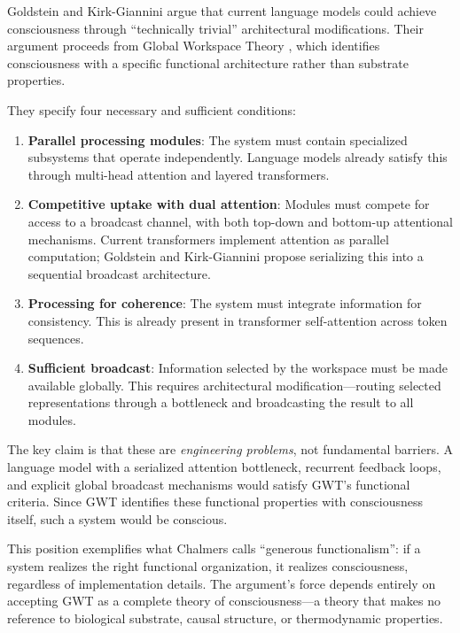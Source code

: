 Goldstein and Kirk-Giannini \cite{goldstein2024case} argue that current language models
could achieve consciousness through ``technically trivial'' architectural modifications.
Their argument proceeds from Global Workspace Theory \cite{baars1988cognitive,
dehaene2014toward}, which identifies consciousness with a specific functional architecture
rather than substrate properties.

They specify four necessary and sufficient conditions:

\begin{enumerate}[leftmargin=2em]
\item \textbf{Parallel processing modules}: The system must contain specialized subsystems
      that operate independently. Language models already satisfy this through multi-head
      attention and layered transformers.
\item \textbf{Competitive uptake with dual attention}: Modules must compete for access to
      a broadcast channel, with both top-down and bottom-up attentional mechanisms. Current
      transformers implement attention as parallel computation; Goldstein and Kirk-Giannini
      propose serializing this into a sequential broadcast architecture.
\item \textbf{Processing for coherence}: The system must integrate information for
      consistency. This is already present in transformer self-attention across token
      sequences.
\item \textbf{Sufficient broadcast}: Information selected by the workspace must be made
      available globally. This requires architectural modification---routing selected
      representations through a bottleneck and broadcasting the result to all modules.
\end{enumerate}

The key claim is that these are \emph{engineering problems}, not fundamental barriers. A
language model with a serialized attention bottleneck, recurrent feedback loops, and explicit
global broadcast mechanisms would satisfy GWT's functional criteria. Since GWT identifies
these functional properties with consciousness itself, such a system would be conscious.

This position exemplifies what Chalmers \cite{chalmers2023could} calls ``generous
functionalism'': if a system realizes the right functional organization, it realizes
consciousness, regardless of implementation details. The argument's force depends entirely
on accepting GWT as a complete theory of consciousness---a theory that makes no reference
to biological substrate, causal structure, or thermodynamic properties.

